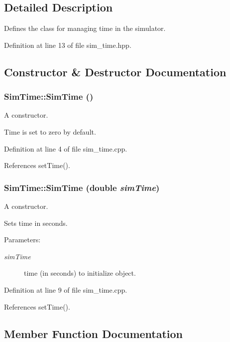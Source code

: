 \subsection{Detailed Description}
Defines the class for managing time in the simulator. 



Definition at line 13 of file sim\_\-time.hpp.

\subsection{Constructor \& Destructor Documentation}
\subsubsection{\setlength{\rightskip}{0pt plus 5cm}Sim\-Time::Sim\-Time ()}\label{classSimTime_ad8d1396857e60887b0b890fd126ed8d}


A constructor. 

Time is set to zero by default. 

Definition at line 4 of file sim\_\-time.cpp.

References set\-Time().
\subsubsection{\setlength{\rightskip}{0pt plus 5cm}Sim\-Time::Sim\-Time (double {\em sim\-Time})}\label{classSimTime_ea951cac501a0a77b79f47cd322bd1d8}


A constructor. 

Sets time in seconds. \begin{Desc}
\item[Parameters:]
\begin{description}
\item[{\em sim\-Time}]time (in seconds) to initialize object. \end{description}
\end{Desc}


Definition at line 9 of file sim\_\-time.cpp.

References set\-Time().

\subsection{Member Function Documentation}
